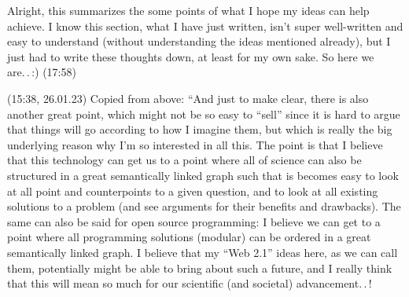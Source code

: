 \documentclass{report}
\begin{document}
Alright, this summarizes the some points of what I hope my ideas can help achieve. I know this section, what I have just written, isn't super well-written and easy to understand (without understanding the ideas mentioned already), but I just had to write these thoughts down, at least for my own sake. So here we are.\,.\,:) (17:58)


(15:38, 26.01.23) Copied from above: ``And just to make clear, there is also another great point, which might not be so easy to ``sell'' since it is hard to argue that things will go according to how I imagine them, but which is really the big underlying reason why I'm so interested in all this. The point is that I believe that this technology can get us to a point where all of science can also be structured in a great semantically linked graph such that is becomes easy to look at all point and counterpoints to a given question, and to look at all existing solutions to a problem (and see arguments for their benefits and drawbacks). The same can also be said for open source programming: I believe we can get to a point where all programming solutions (modular) can be ordered in a great semantically linked graph. I believe that my ``Web 2.1'' ideas here, as we can call them, potentially might be able to bring about such a future, and I really think that this will mean so much for our scientific (and societal) advancement.\,.\,! %
\end{document}
